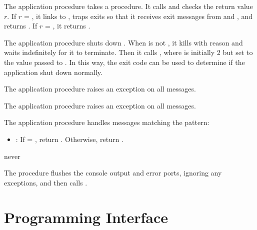  The application  procedure
takes a  procedure. It calls  and
checks the return value $r$. If $r$ = ,
it links to , traps exits so that it receives exit
messages from  and , and
returns . If $r$ = , it returns .

 The application 
procedure shuts down . When  is not
, it kills  with reason  and
waits indefinitely for it to terminate. Then it calls
, where  is
initially 2 but set to the value passed to
. In this way, the exit code can be used
to determine if the application shut down normally.

 The application
 procedure raises an exception on all messages.

 The application
 procedure raises an exception on all messages.

 The application
 procedure handles messages matching the pattern:\antipar

\begin{itemize}
\item {}: If  =
  , return . Otherwise,
  return .
\end{itemize}

\begin{procedure}
\end{procedure}
\returns{} never

The  procedure flushes the console output and error
ports, ignoring any exceptions, and then calls .

\section {Programming Interface}

\begin{procedure}
\end{procedure}
\returns{} 

